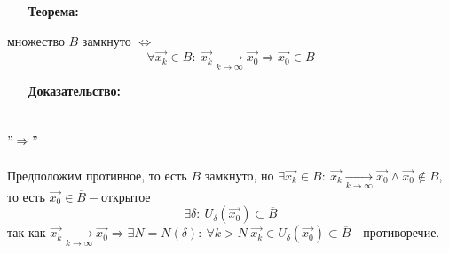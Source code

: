 \documentclass[12pt, letterpaper, twoside]{article}
\begin{document}
\begin{enumerate}
    \item[\textbf{Теорема:}]
\end{enumerate}
множество $B$ замкнуто $\Leftrightarrow$ 
$$\forall \vec{x_k} \in B:\ \vec{x_k} \underset{k\to\infty}{\longrightarrow}\vec{x_0}
\Rightarrow \vec{x_0} \in B$$
\begin{enumerate}
    \item[\textbf{Доказательство:}]
\end{enumerate}
\subsection*{$"\Rightarrow"$}
Предположим противное, то есть $B$ замкнуто, но $\exists \vec{x_k} \in B:\ \vec{x_k} \underset{k\to\infty}{\longrightarrow}\vec{x_0}
\wedge \vec{x_0} \notin B$, то есть $\vec{x_0}\in \overline{B} - \text{открытое}$\\
$$\exists \delta:\ U_\delta(\vec{x_0})\subset \overline{B}$$
так как $\vec{x_k} \underset{k\to\infty}{\longrightarrow}\vec{x_0}\Rightarrow \exists N = N(\delta):\ \forall k > N\ \vec{x_k}\in U_\delta(\vec{x_0})\subset \overline{B}$ - противоречие.
\end{document}
